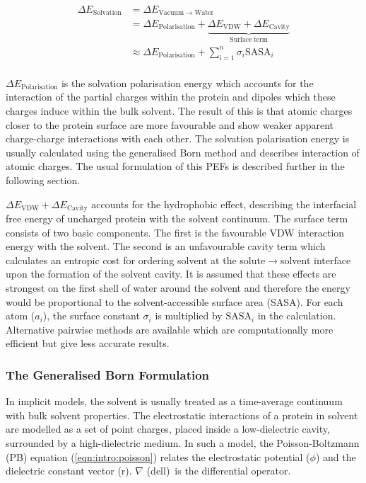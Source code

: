 \begin{equation}
\begin{array}{ll}
\Delta E_\mathrm{Solvation} 
& = \Delta E_\mathrm{Vacuum \to Water} \\
& = \Delta E_\mathrm{Polarisation} + \underbrace{ \Delta E_\mathrm{VDW} + \Delta E_\mathrm{Cavity}}_{\mathrm{Surface~term}}
\\
& \approx \Delta E_\mathrm{Polarisation} + \displaystyle \sum^n_\mathrm{i=1} \sigma_i
\mathrm{SASA}_i \\
\end{array}
\label{eqn:intro:impsol}
\end{equation}

$\Delta E_\mathrm{Polarisation}$ is the solvation polarisation energy which accounts for the interaction of the partial charges
within the protein and dipoles which these charges induce within the bulk
solvent. The result of this is that atomic charges closer to the protein surface are more favourable and show weaker apparent charge-charge interactions with each other. The solvation polarisation energy is usually calculated using the generalised Born method and describes interaction of atomic charges.
The usual formulation of this PEFs is described further in the following section.

$\Delta E_\mathrm{VDW} + \Delta E_\mathrm{Cavity}$ accounts for the hydrophobic effect, describing the interfacial free energy of uncharged protein with the solvent continuum. The surface term consists of two basic components. The first is the favourable VDW interaction energy with the solvent. The second is an unfavourable cavity term which calculates an entropic cost for ordering solvent at the solute$\to$solvent interface upon the formation of the solvent cavity. It is assumed that these effects are strongest on the first shell of water around the solvent and therefore the energy would be proportional to the solvent-accessible surface area (SASA)\cite{FORCEFIELD:SASA}. For each atom ($a_i$), the surface constant $\sigma_i$
is  multiplied by $\mathrm{SASA}_i$ in the calculation.
Alternative pairwise methods are available which are computationally
more efficient but give less accurate results\cite{FORCEFIELD:POPS}.

 
\subsubsection{The Generalised Born Formulation}
\label{section:intro:gb}

In implicit models, the solvent is usually treated as a time-average
continuum with bulk solvent properties. The electrostatic interactions of a protein in solvent
are modelled as a set of point charges,  placed inside a low-dielectric cavity, surrounded
by a high-dielectric medium. In such a model, the Poisson-Boltzmann (PB) equation (\ref{eqn:intro:poisson})
relates the electrostatic potential ($\phi$) and the dielectric constant vector (r).   $\nabla$ (dell)\ is the differential operator.

